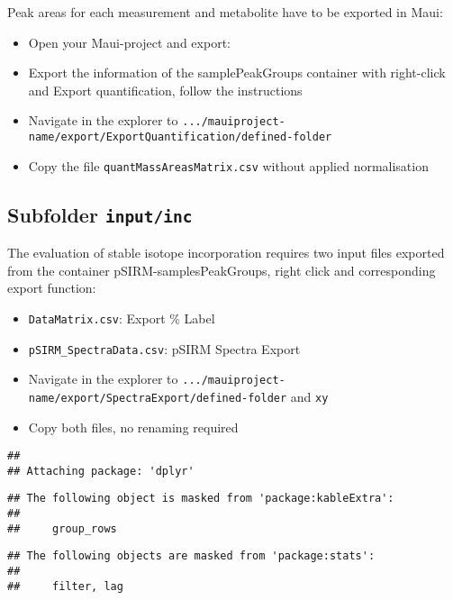 \documentclass[]{book}
\providecommand{\tightlist}{%
  \setlength{\itemsep}{0pt}\setlength{\parskip}{0pt}}
\begin{document}
Peak areas for each measurement and metabolite have to be exported in Maui:

\begin{itemize}
\tightlist
\item
  Open your Maui-project and export:
\item
  Export the information of the samplePeakGroups container with right-click and Export quantification, follow the instructions
\item
  Navigate in the explorer to \texttt{.../mauiproject-name/export/ExportQuantification/defined-folder}
\item
  Copy the file \texttt{quantMassAreasMatrix.csv} without applied normalisation
\end{itemize}

\hypertarget{subfolder-inputinc}{%
\subsection{\texorpdfstring{Subfolder \texttt{input/inc}}{Subfolder input/inc}}\label{subfolder-inputinc}}

The evaluation of stable isotope incorporation requires two input files exported from the container pSIRM-samplesPeakGroups, right click and corresponding export function:

\begin{itemize}
\tightlist
\item
  \texttt{DataMatrix.csv}: Export \% Label
\item
  \texttt{pSIRM\_SpectraData.csv}: pSIRM Spectra Export
\item
  Navigate in the explorer to \texttt{.../mauiproject-name/export/SpectraExport/defined-folder} and \texttt{xy}
\item
  Copy both files, no renaming required
\end{itemize}

\begin{verbatim}
## 
## Attaching package: 'dplyr'
\end{verbatim}

\begin{verbatim}
## The following object is masked from 'package:kableExtra':
## 
##     group_rows
\end{verbatim}

\begin{verbatim}
## The following objects are masked from 'package:stats':
## 
##     filter, lag
\end{verbatim}
\end{document}
